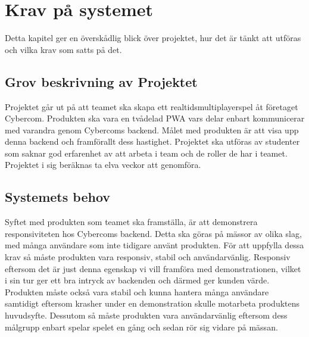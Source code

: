 \documentclass[10pt]{article}
\begin{document}
		
\pagebreak
\section{Krav på systemet}
	Detta kapitel ger en överskådlig blick över projektet, hur det är tänkt att utföras och vilka krav som satts på det.

	\subsection{Grov beskrivning av Projektet}
	Projektet går ut på att teamet ska skapa ett realtidsmultiplayerspel åt företaget Cybercom. Produkten ska vara en tvådelad PWA vars delar enbart kommunicerar med varandra genom Cybercoms backend. Målet med produkten är att visa upp denna backend och framförallt dess hastighet.
	Projektet ska utföras av studenter som saknar god erfarenhet av att arbeta i team och de roller de har i teamet. Projektet i sig beräknas ta elva veckor att genomföra. 
	
	\subsection{Systemets behov}
	Syftet med produkten som teamet ska framställa, är att demonstrera responsiviteten hos Cybercoms backend. Detta ska göras på mässor av olika slag, med många användare som inte tidigare använt produkten. För att uppfylla dessa krav så måste produkten vara responsiv, stabil och användarvänlig. Responsiv eftersom det är just denna egenskap vi vill framföra med demonstrationen, vilket i sin tur ger ett bra intryck av backenden och därmed ger kunden värde. Produkten måste också vara stabil och kunna hantera många användare samtidigt eftersom krasher under en demonstration skulle motarbeta produktens huvudsyfte. Dessutom så måste produkten vara användarvänlig eftersom dess målgrupp enbart spelar spelet en gång och sedan rör sig vidare på mässan.
	
	
\end{document}
